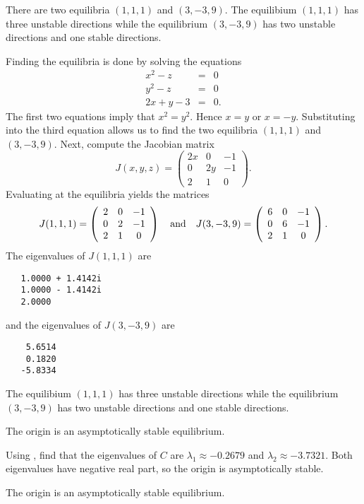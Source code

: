 \documentclass{ximera}
\begin{document}
\newpage
{} \ans There are two equilibria $(1,1,1)$ and $(3,-3,9)$.
The equilibium $(1,1,1)$ has three unstable directions while the
equilibrium $(3,-3,9)$ has two unstable directions and one stable directions.

\soln  Finding the equilibria is done by solving the equations
\begin{eqnarray*}
x^2-z & = & 0 \\
y^2-z & = & 0 \\
2x+y-3 & = & 0.
\end{eqnarray*}
The first two equations imply that $x^2=y^2$.  Hence $x=y$ or $x=-y$. 
Substituting into the third equation allows us to find the two equilibria
$(1,1,1)$ and $(3,-3,9)$.  Next, compute the Jacobian matrix
\[
J(x,y,z) = \left(\begin{array}{ccc}
2x & 0 & -1\\ 0 & 2y & -1\\ 2 & 1 & 0 \end{array}\right).
\]
Evaluating at the equilibria yields the matrices
\[
J(1,1,1) = \left(\begin{array}{ccc}
2 & 0 & -1\\ 0 & 2 & -1\\ 2 & 1 & 0 \end{array}\right)
\quad\mbox{and}\quad 
J(3,-3,9) = \left(\begin{array}{ccc}
6 & 0 & -1\\ 0 & 6 & -1\\ 2 & 1 & 0 \end{array}\right).
\]
The eigenvalues of $J(1,1,1)$ are
\begin{verbatim}
   1.0000 + 1.4142i
   1.0000 - 1.4142i
   2.0000     
\end{verbatim}
and the eigenvalues of $J(3,-3,9)$ are
\begin{verbatim}
    5.6514
    0.1820
   -5.8334
\end{verbatim}
The equilibium $(1,1,1)$ has three unstable directions while the
equilibrium $(3,-3,9)$ has two unstable directions and one stable 
directions.

\ans The origin is an asymptotically stable equilibrium.

\soln Using \Matlabp, find that the eigenvalues of $C$ are $\lambda_1
\approx -0.2679$ and $\lambda_2 \approx -3.7321$.  Both eigenvalues
have negative real part, so the origin is asymptotically stable.

\ans The origin is an asymptotically stable equilibrium.
\end{document}
